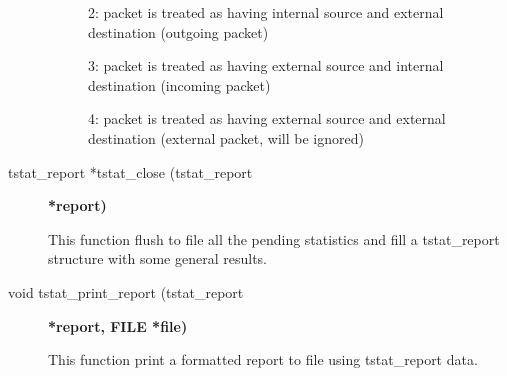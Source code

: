\documentclass[11pt]{article}
\begin{document}
\begin{description}
\begin{description}
\item[{}] \mbox{}

2: packet is treated as having internal source and external destination (outgoing packet)


\item[{}] \mbox{}

3: packet is treated as having external source and internal destination (incoming packet)


\item[{}] \mbox{}

4: packet is treated as having external source and external destination (external packet, will be ignored)

\end{description}

\item[{tstat\_report *tstat\_close (tstat\_report}] \textbf{*report)}

This function flush to file all the pending statistics
and fill a tstat\_report structure with some general
results.


\item[{void tstat\_print\_report (tstat\_report}] \textbf{*report, FILE *file)}

This function print a formatted report to file
using tstat\_report data.

\end{description}
\end{document}
